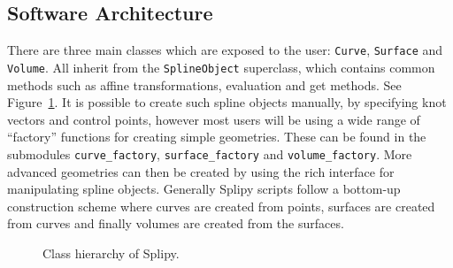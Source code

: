 \documentclass[preprint,12pt, a4paper]{elsarticle}
\begin{document}
\subsection{Software Architecture}
\label{sec:architecture}

There are three main classes which are exposed to the user: \texttt{Curve}, \texttt{Surface} and \texttt{Volume}.
All inherit from the \texttt{SplineObject} superclass, which contains common methods such as affine transformations, evaluation and get methods.
See Figure~\ref{fig:hierarchy}.
It is possible to create such spline objects manually, by specifying knot vectors and control points, however most users will be using a wide range of ``factory'' functions for creating simple geometries.
These can be found in the submodules \texttt{curve\_factory}, \texttt{surface\_factory} and \texttt{volume\_factory}.
More advanced geometries can then be created by using the rich interface for manipulating spline objects.
Generally Splipy scripts follow a bottom-up construction scheme where curves are created from points, surfaces are created from curves and finally volumes are created from the surfaces.

\begin{figure}
  \begin{center}
  \end{center}
  \label{fig:hierarchy}
  \caption{Class hierarchy of Splipy.}
\end{figure}
\end{document}
